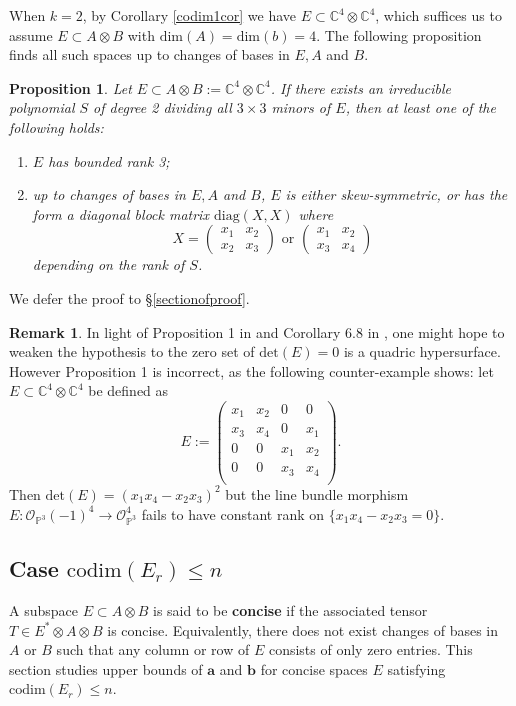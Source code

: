 \documentclass[10pt]{article} %
\newcommand{\aaa}{\mathbf{a}}
\newcommand{\bbb}{\mathbf{b}}
\newcommand{\BC}{\mathbb{C}}
\newcommand{\ot}{\otimes}
\newtheorem{prop}[thm]{Proposition}
\theoremstyle{definition}
\newtheorem{rem}[thm]{Remark}
\begin{document}
When $k=2$, by Corollary \ref{codim1cor} we have $E\subset \mathbb{C}^4\otimes\mathbb{C}^4$, which suffices us to assume $E\subset A\ot B$ with $\mathrm{dim}(A)=\mathrm{dim}(b)=4$. The following proposition finds all such spaces up to changes of bases in $E,A$ and $B$. 

\begin{prop}\label{E2codim1prop}
Let $E\subset A\otimes B:=\BC^4\ot\BC^4$. If there exists an irreducible polynomial $S$ of degree 2 dividing all $3\times 3$ minors of $E$, then at least one of the following holds:
\begin{enumerate}
    \item $E$ has bounded rank 3;
    \item up to changes of bases in $E,A$ and $B$, $E$ is either skew-symmetric, or has the form a diagonal block matrix $\mathrm{diag}(X,X)$ where
    $$X=\begin{pmatrix}
    x_1 & x_2\\
    x_2 & x_3
    \end{pmatrix}\text{ or }
    \begin{pmatrix}
    x_1 & x_2\\
    x_3 & x_4
    \end{pmatrix}$$
    depending on the rank of $S$.
\end{enumerate}
\end{prop}

We defer the proof to \S \ref{sectionofproof}.

\begin{rem}\label{error}
In light of Proposition 1 in \cite{beauville2018introduction} and Corollary 6.8 in \cite{beilinson}, one might hope to weaken the hypothesis to the zero set of $\mathrm{det}(E)=0$ is a quadric hypersurface. However Proposition 1 is incorrect, as the following counter-example shows: let $E\subset \BC^4\ot\BC^4$ be defined as
$$E:=\begin{pmatrix}
x_1 & x_2 & 0 & 0\\
x_3 & x_4 & 0 & x_1\\
0 & 0 & x_1 & x_2\\
0 & 0 & x_3 & x_4\\
\end{pmatrix}.$$
Then $\mathrm{det}(E)=(x_1x_4-x_2x_3)^2$ but the line bundle morphism $E:\mathcal{O}_{\mathbb{P}^3}(-1)^4\rightarrow \mathcal{O}_{\mathbb{P}^3}^4$ fails to have constant rank on $\{x_1x_4-x_2x_3=0\}$.
\end{rem}

\subsection{Case $\mathrm{codim}(E_r)\leq n$}
A subspace $E\subset A\ot B$ is said to be \textbf{concise} if the associated tensor $T\in E^*\ot A\ot B$ is concise. Equivalently, there does not exist changes of bases in $A$ or $B$ such that any column or row of $E$ consists of only zero entries. This section studies upper bounds of $\aaa$ and $\bbb$ for concise spaces $E$ satisfying $\mathrm{codim}(E_r)\leq n$.
\end{document}
